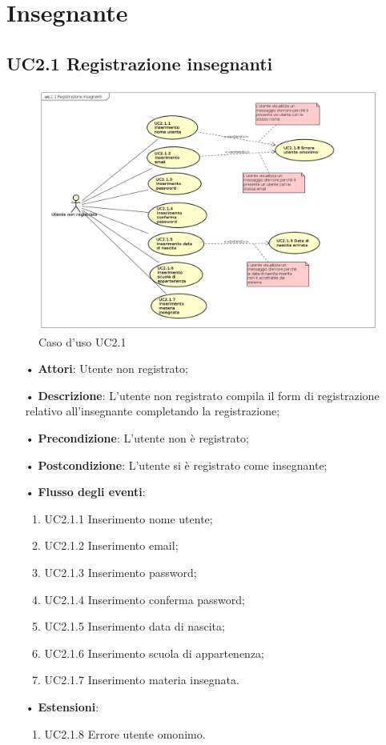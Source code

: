 
\section{Insegnante}

\subsection{UC2.1 Registrazione insegnanti}

\begin{figure}[H]
\centering
\includegraphics[width=17cm]{img/UC21.png} 
\caption{Caso d'uso UC2.1}
\end{figure}

\begin{itemize}
	\item[•] \textbf{Attori}: Utente non registrato;
	\item[•] \textbf{Descrizione}:  L’utente non registrato compila il form di registrazione relativo all’insegnante completando la registrazione;
	\item[•] \textbf{Precondizione}: L’utente non è registrato;
	\item[•] \textbf{Postcondizione}: L’utente si è registrato come insegnante;
	\item[•] \textbf{Flusso degli eventi}:
		\begin{enumerate}
			\item UC2.1.1 Inserimento nome utente;
			\item UC2.1.2 Inserimento email;
			\item UC2.1.3 Inserimento password;
			\item UC2.1.4 Inserimento conferma password;
			\item UC2.1.5 Inserimento data di nascita;
			\item UC2.1.6 Inserimento scuola di appartenenza;
			\item UC2.1.7 Inserimento materia insegnata.
		\end{enumerate}
	\item[•] \textbf{Estensioni}:
		\begin{enumerate}
			\item UC2.1.8 Errore utente omonimo.
		\end{enumerate}
\end{itemize}

